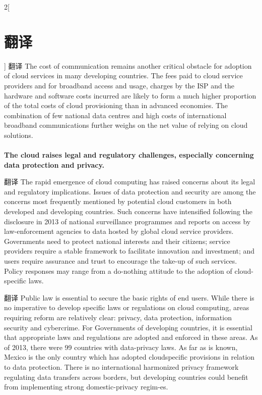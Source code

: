 \documentclass[a4paper, UTF8, 12pt]{article}
\begin{document}
\begin{paracol}{2}[\section{翻译}]
    \switchcolumn*
    翻译
    \switchcolumn
    The cost of communication remains another critical obstacle for adoption of cloud services in many developing countries. The fees paid to cloud service providers and for broadband access and usage, charges by the ISP and the hardware and software costs incurred are likely to form a much higher proportion of the total costs of cloud provisioning than in advanced economies. The combination of few national data centres and high costs of international broadband communications further weighs on the net value of relying on cloud solutions. 

    
    

    \switchcolumn*
    \paragraph{} 
    \switchcolumn
    {\bfseries The cloud raises legal and regulatory challenges, especially concerning data protection and privacy.}


    \switchcolumn*
    翻译
    \switchcolumn
    The rapid emergence of cloud computing has raised concerns about its legal and regulatory implications. Issues of data protection and security are among the concerns most frequently mentioned by potential cloud customers in both developed and developing countries. Such concerns have intensified following the disclosure in 2013 of national surveillance programmes and reports on access by law-enforcement agencies to data hosted by global cloud service providers. Governments need to protect national interests and their citizens; service providers require a stable framework to facilitate innovation and investment; and users require assurance and trust to encourage the take-up of such services. Policy responses may range from a do-nothing attitude to the adoption of cloud-specific laws. 

    \switchcolumn*
    翻译
    \switchcolumn
    Public law is essential to secure the basic rights of end users. While there is no imperative to develop specific laws or regulations on cloud computing, areas requiring reform are relatively clear: privacy, data protection, information security and cybercrime. For Governments of developing countries, it is essential that appropriate laws and regulations are adopted and enforced in these areas. As of 2013, there were 99 countries with data-privacy laws. As far as is known, Mexico is the only country which has adopted cloudspecific provisions in relation to data protection. There is no international harmonized privacy framework regulating data transfers across borders, but developing countries could benefit from implementing strong domestic-privacy regim-es.


\end{paracol}
\end{document}
